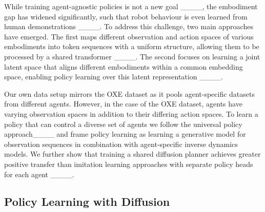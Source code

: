 While training agent-agnostic policies is not a new goal ____, the embodiment gap has widened significantly, such that robot behaviour is even learned from human demonstrations ____. To address this challenge, two main approaches have emerged. The first maps different observation and action spaces of various embodiments into token sequences with a uniform structure, allowing them to be processed by a shared transformer ____. The second focuses on learning a joint latent space that aligns different embodiments within a common embedding space, enabling policy learning over this latent representation ____.

Our own data setup mirrors the OXE dataset as it pools agent-specific datasets from different agents. However, in the case of the OXE dataset, agents have varying observation spaces in addition to their differing action spaces. To learn a policy that can control a diverse set of agents we follow the universal policy approach____ and frame policy learning as learning a generative model for observation sequences in combination with agent-specific inverse dynamics models. We further show that training a shared diffusion planner achieves greater positive transfer than imitation learning approaches with separate policy heads for each agent ____.








\subsection{Policy Learning with Diffusion}

